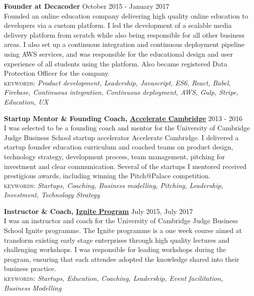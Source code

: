 \documentclass[10pt]{article}
\newcommand{\linkto}[2]{\href{#1}{\color{darkblue}\setulcolor{darkblue}\ul{#2}}}
\newcommand{\blankline}{\quad\pagebreak[2]}
\begin{document}
\blankline


\textbf{Founder at Decacoder} \hfill October 2015 - January 2017\\
Founded an online education company delivering high quality online education to developers via a custom platform. I led the development of a scalable media delivery platform from scratch while also being responsible for all other business areas. I also set up a continuous integration and continuous deployment pipeline using AWS services, and was responsible for the educational design and user experience of all students using the platform. Also became registered Data Protection Officer for the company.\\
{\small \textsc{keywords:} \emph{Product development, Leadership, Javascript, ES6, React, Babel, Firebase, Continuous integration, Continuous deployment, AWS, Gulp, Stripe, Education, UX}}

\blankline

\textbf{Startup Mentor \& Founding Coach, \linkto{https://www.jbs.cam.ac.uk/entrepreneurship/programmes/accelerate-cambridge/programmes/}{Accelerate Cambridge}}  \hfill 2013 - 2016\\
I was selected to be a founding coach and mentor for the University of Cambridge Judge Business School startup accelerator Accelerate Cambridge. I delivered a startup founder education curriculum and coached teams on product design, technology strategy, development process, team management, pitching for investment and clear communication. Several of the startups I mentored received prestigious awards, including winning the Pitch@Palace competition. \\
{\small \textsc{keywords:} \emph{Startups, Coaching, Business modelling, Pitching, Leadership, Investment, Technology Strategy}}

\blankline

\textbf{Instructor \& Coach, \linkto{https://www.jbs.cam.ac.uk/entrepreneurship/programmes/ignite/}{Ignite Program} }  \hfill July 2015, July 2017\\
I was an instructor and coach for the University of Cambridge Judge Business School Ignite programme. The Ignite programme is a one week course aimed at transform existing early stage enterprises through high quality lectures and challenging workshops. I was responsible for leading workshops during the program, ensuring that each attendee adopted the knowledge shared into their business practice.\\
{\small \textsc{keywords:} \emph{Startups, Education, Coaching, Leadership, Event facilitation, Business Modelling}}
\end{document}

